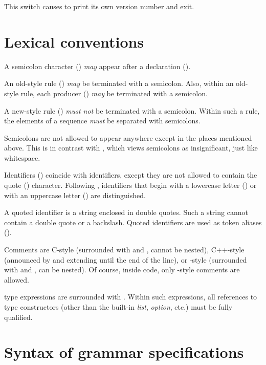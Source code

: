 \documentclass[onecolumn,11pt,nocopyrightspace,preprint]{sigplanconf}
\begin{document}
\docswitch{\oversion} This switch causes \menhir to print its own version
number and exit.


\section{Lexical conventions}

A semicolon character (\kw{;}) \emph{may} appear after a declaration
().

An old-style rule () \emph{may} be terminated with a
semicolon. Also, within an old-style rule, each producer
() \emph{may} be terminated with a semicolon.

A new-style rule () \emph{must not} be terminated with a
semicolon. Within such a rule, the elements of a sequence \emph{must} be
separated with semicolons.

Semicolons are not allowed to appear anywhere except in the places mentioned
above. This is in contrast with \ocamlyacc, which views semicolons as
insignificant, just like whitespace.

Identifiers () coincide with \ocaml identifiers, except they are not
allowed to contain the quote () character. Following
\ocaml, identifiers that begin with a lowercase letter
() or with an uppercase letter () are distinguished.

A quoted identifier  is a string enclosed in double quotes.
Such a string cannot contain a double quote or a backslash.
Quoted identifiers are used as token aliases ().

Comments are C-style (surrounded with \kw{/*} and \kw{*/}, cannot be nested),
C++-style (announced by \kw{/$\!$/} and extending until the end of the line), or
\ocaml-style (surrounded with \kw{(*} and \kw{*)}, can be nested). Of course,
inside \ocaml code, only \ocaml-style comments are allowed.

\ocaml type expressions are surrounded with . Within such expressions,
all references to type constructors (other than the built-in \textit{list}, \textit{option}, etc.)
must be fully qualified.


\section{Syntax of grammar specifications}
\end{document}
